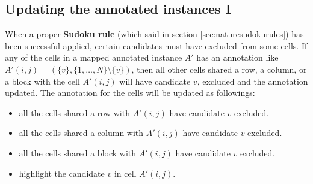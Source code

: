 \documentclass[11pt]{report}
\newcommand{\set}[1]{\{ #1 \}}
\begin{document}
\subsection{Updating the annotated instances I}
\label{sec:UpdatingtheinstancesI}

When a proper \textbf{Sudoku rule} (which said in section \ref{sec:naturesudokurules}) has been successful applied, certain candidates must have excluded from some cells. If any of the cells in a mapped annotated instance $A'$ has an annotation like $A'(i,j) =(\set{v}, \set{1,\dots,N} \setminus \set{v})$, then all other cells shared a row, a column, or a block with the cell $A'(i,j)$ will have candidate $v$, excluded and the annotation updated. The annotation for the cells will be updated as followings:
\begin{itemize}
\item all the cells shared a row with $A'(i,j)$ have candidate $v$ excluded.
\item all the cells shared a column with $A'(i,j)$ have candidate $v$ excluded.
\item all the cells shared a block with $A'(i,j)$ have candidate $v$ excluded.
\item highlight the candidate $v$ in cell $A'(i,j)$.
\end{itemize} 
\end{document}
